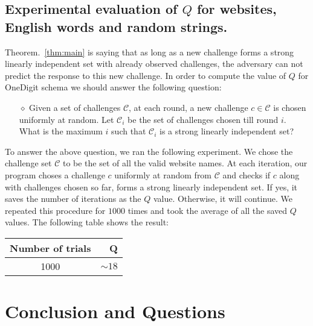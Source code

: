 \documentclass[anon,12pt]{colt2016}
\begin{document}

\subsection{Experimental evaluation of $Q$ for websites, English words and random strings.}

Theorem.~\ref{thm:main} is saying that as long as a new challenge forms a strong linearly independent set with already observed challenges, the adversary can not predict the response to this new challenge. In order to compute the value of $Q$ for OneDigit schema we should answer the following question:
\begin{itemize}
	\item[$\diamond$] Given a set of challenges $\mathcal{C}$, at each round, a new challenge $c \in \mathcal{C}$ is chosen uniformly at random. Let $\mathcal{C}_i$ be the set of challenges chosen till round $i$. What is the maximum $i$
	such that $\mathcal{C}_i$ is a strong linearly independent set?
	\end{itemize}
To answer the above question, we ran the following experiment. We chose the challenge set $\mathcal{C}$ to be the set of all the valid website names. At each iteration, our program choses a challenge $c$ uniformly at random from $\mathcal{C}$ and checks if $c$ along with challenges chosen so far, forms a strong linearly independent set. If yes, it saves the number of iterations as the $Q$ value. Otherwise, it will continue. We repeated this procedure for $1000$ times and took the average of all the saved $Q$ values. The following table shows the result:

\vspace{3mm}


\begin{center}
\begin{tabular}{c|r}
Number of trials              & Q  \\
\hline
1000              &   $\sim 18$             \\
\end{tabular}
\label{QValue}
\end{center}





\section{Conclusion and Questions}




\clearpage




\appendix
\end{document}
